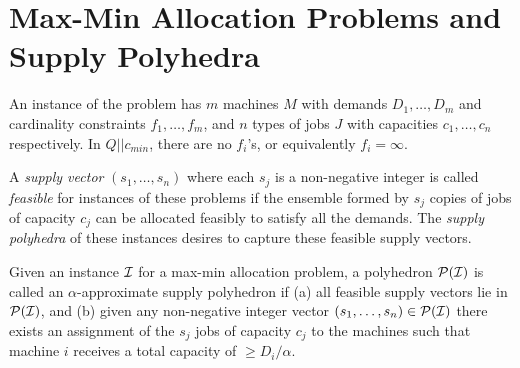 \section{Max-Min Allocation Problems and Supply Polyhedra}\label{sec:supplypolyhedra}
An instance of the \cckp problem has $m$ machines $M$ with demands $D_1,\ldots,D_m$ and cardinality constraints $f_1,\ldots, f_m$, and $n$  types of jobs $J$ with capacities $c_1,\ldots,c_n$ respectively.
In $Q||c_{min}$, there are no $f_i$'s, or equivalently $f_i = \infty$.

A {\em supply vector} $(s_1,\ldots,s_n)$ where each $s_j$ is a non-negative integer
is called {\em feasible} for instances of these problems if the ensemble formed by $s_j$ copies of jobs of capacity $c_j$ can be allocated feasibly to satisfy all the demands.
The {\em supply polyhedra} of these instances desires to capture these feasible supply vectors.

\begin{definition}\label{def:supp-poly}
	Given an instance ${\cal I}$ for a max-min allocation problem, a polyhedron ${\cal P}({\cal I})$ is called an $\alpha$-approximate supply polyhedron if
	(a) all feasible supply vectors lie in ${\cal P}({\cal I})$, and (b) given any non-negative integer vector $(s_1,\ldots,s_n)\in {\cal P}({\cal I})$ there exists an assignment
	of the $s_j$ jobs of capacity $c_j$ to the machines such that machine $i$ receives a total capacity of $\geq D_i/\alpha$.
\end{definition}

